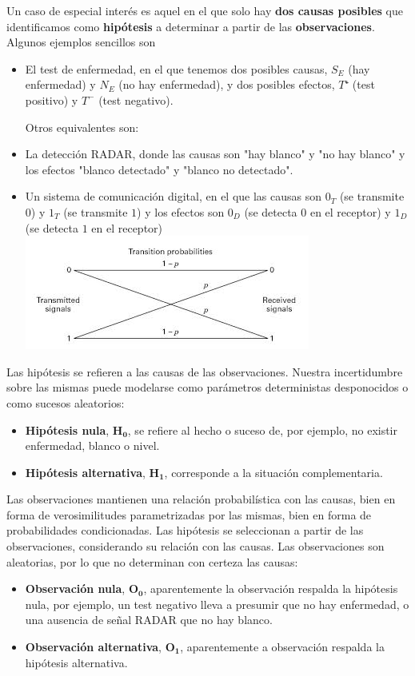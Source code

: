 \documentclass[11pt]{article}
\makeatletter
\def\maxwidth{\ifdim\Gin@nat@width>\linewidth\linewidth
    \else\Gin@nat@width\fi}
\let\Oldincludegraphics\includegraphics
\renewcommand{\includegraphics}[1]{\Oldincludegraphics[width=.8\maxwidth]{#1}}
\makeatother
\begin{document}
    Un caso de especial interés es aquel en el que solo hay \textbf{dos
causas posibles} que identificamos como \textbf{hipótesis} a determinar
a partir de las \textbf{observaciones}. Algunos ejemplos sencillos son 
\begin{itemize}
\item
El test de enfermedad, en el que tenemos dos posibles causas, \(S_E\)
(hay enfermedad) y \(N_E\) (no hay enfermedad), y dos posibles efectos,
\(T⁺\) (test positivo) y \(T^-\) (test negativo). 

Otros equivalentes
son: 
\item La detección RADAR, donde las causas son "hay blanco" y "no hay
blanco" y los efectos "blanco detectado" y "blanco no detectado". 
\item Un
sistema de comunicación digital, en el que las causas son \(0_T\) (se
transmite \(0\)) y \(1_T\) (se transmite \(1\)) y los efectos son
\(0_D\) (se detecta \(0\) en el receptor) y \(1_D\) (se detecta \(1\) en
el receptor) \includegraphics{diagrama_canal_binario.jpg}
\end{itemize}

    Las hipótesis se refieren a las causas de las observaciones. Nuestra
incertidumbre sobre las mismas puede modelarse como parámetros
deterministas desponocidos o como sucesos aleatorios: 
\begin{itemize}
\item \textbf{Hipótesis nula}, \(\mathbf{H_0}\), se refiere al hecho o suceso
de, por ejemplo, no existir enfermedad, blanco o nivel. 
\item \textbf{Hipótesis alternativa}, \(\mathbf{H_1}\), corresponde a la
situación complementaria.
\end{itemize}

Las observaciones mantienen una relación probabilística con las causas,
bien en forma de verosimilitudes parametrizadas por las mismas, bien en
forma de probabilidades condicionadas. Las hipótesis se seleccionan a
partir de las observaciones, considerando su relación con las causas.
Las observaciones son aleatorias, por lo que no determinan con certeza
las causas: 
\begin{itemize}
\item \textbf{Observación nula}, \(\mathbf{O_0}\), aparentemente
la observación respalda la hipótesis nula, por ejemplo, un test negativo
lleva a presumir que no hay enfermedad, o una ausencia de señal RADAR
que no hay blanco. 
\item \textbf{Observación alternativa}, \(\mathbf{O_1}\),
aparentemente a observación respalda la hipótesis alternativa.
\end{itemize}
  
\end{document}
